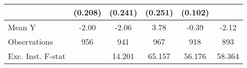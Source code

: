 {\begin{tabular}{l*{5}{c}}
            &     (0.208)         &     (0.241)         &     (0.251)         &     (0.102)         &                     \\
\midrule
Mean Y      &       -2.00         &       -2.06         &        3.78         &       -0.39         &       -2.12         \\
Observations&         956         &         941         &         967         &         918         &         893         \\
Exc. Inst. F-stat&                     &      14.201         &      65.157         &      56.176         &      58.364         \\
\bottomrule
\end{tabular}
}
